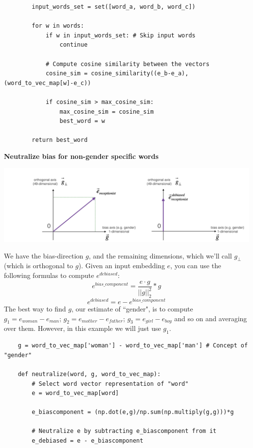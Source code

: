 \documentclass[11pt, a4paper]{article}
\begin{document}
\begin{spacing}{1.1}
\begin{lstlisting}
		input_words_set = set([word_a, word_b, word_c])
		
		for w in words:        
			if w in input_words_set: # Skip input words
				continue
			
			# Compute cosine similarity between the vectors
			cosine_sim = cosine_similarity((e_b-e_a), (word_to_vec_map[w]-e_c))
			
			if cosine_sim > max_cosine_sim:
				max_cosine_sim = cosine_sim
				best_word = w
		
		return best_word \end{lstlisting} \newpage

	\noindent \textbf{Neutralize bias for non-gender specific words}
	\begin{center}
		\includegraphics[scale=.3]{neutral}
	\end{center}
	We have the bias-direction $g$, and the remaining dimensions, which we'll call $g_{\perp}$ (which is orthogonal to $g$). Given an input embedding $e$, you can use the following formulas to compute $e^{debiased}$: 	
	$$e^{bias\_component} = \frac{e \cdot g}{||g||_2^2} * g$$
	$$e^{debiased} = e - e^{bias\_component}$$
	The best way to find $g$, our estimate of ``gender", is to compute $g_1 = e_{woman} - e_{man}$; $g_2 = e_{mother} - e_{father}$; $g_3 = e_{girl} - e_{boy}$ and so on and averaging over them. However, in this example we will just use $g_1$.
	\begin{lstlisting}
	g = word_to_vec_map['woman'] - word_to_vec_map['man'] # Concept of "gender"
	
	def neutralize(word, g, word_to_vec_map):
		# Select word vector representation of "word"
		e = word_to_vec_map[word]
		
		e_biascomponent = (np.dot(e,g)/np.sum(np.multiply(g,g)))*g
		
		# Neutralize e by subtracting e_biascomponent from it 
		e_debiased = e - e_biascomponent
	

\end{lstlisting}
\end{spacing}
\end{document}

